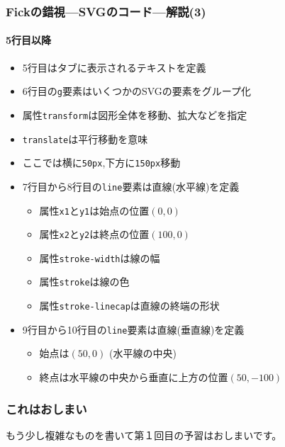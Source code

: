 \begin{frame}[containsverbatim]
\frametitle{Fickの錯視---SVGのコード---解説(3)}
 \framesubtitle{5行目以降}
 \begin{itemize}
  \item 5行目はタブに表示されるテキストを定義
  \item 6行目の\texttt{g}要素はいくつかのSVGの要素をグループ化
  \item 属性\texttt{transform}は図形全体を移動、拡大などを指定
  \item \texttt{translate}は平行移動を意味
  \item ここでは横に\texttt{50px},下方に\texttt{150px}移動
  \item 7行目から8行目の\texttt{line}要素は直線(水平線)を定義
        \begin{itemize}
         \item 属性\texttt{x1}と\texttt{y1}は始点の位置$(0,0)$
         \item 属性\texttt{x2}と\texttt{y2}は終点の位置$(100,0)$
         \item 属性\texttt{stroke-width}は線の幅
         \item 属性\texttt{stroke}は線の色
         \item 属性\texttt{stroke-linecap}は直線の終端の形状
        \end{itemize}
  \item 9行目から10行目の\texttt{line}要素は直線(垂直線)を定義
        \begin{itemize}
         \item 始点は$(50,0)$ (水平線の中央)
         \item 終点は水平線の中央から垂直に上方の位置$(50,-100)$
        \end{itemize}
 \end{itemize}
\end{frame}
\begin{frame}[containsverbatim]
 \frametitle{これはおしまい}
 もう少し複雑なものを書いて第１回目の予習はおしまいです。
\end{frame}

\begin{frame}[containsverbatim]
\frametitle{}
\end{frame}

